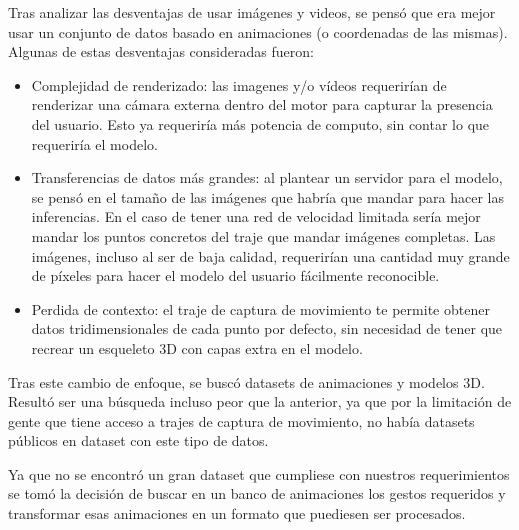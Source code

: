 Tras analizar las desventajas de usar imágenes y videos, se pensó que era mejor usar un conjunto de datos basado en animaciones (o coordenadas de las mismas). Algunas de estas desventajas consideradas fueron:
\begin{itemize}
    \item Complejidad de renderizado: las imagenes y/o vídeos requerirían de renderizar una cámara externa dentro del motor para capturar la presencia del usuario. Esto ya requeriría más potencia de computo, sin contar lo que requeriría el modelo.
    \item Transferencias de datos más grandes: al plantear un servidor para el modelo, se pensó en el tamaño de las imágenes que habría que mandar para hacer las inferencias. En el caso de tener una red de velocidad limitada sería mejor mandar los puntos concretos del traje que mandar imágenes completas. Las imágenes, incluso al ser de baja calidad, requerirían una cantidad muy grande de píxeles para hacer el modelo del usuario fácilmente reconocible.
    \item Perdida de contexto: el traje de captura de movimiento te permite obtener datos tridimensionales de cada punto por defecto, sin necesidad de tener que recrear un esqueleto 3D con capas extra en el modelo.
\end{itemize}

Tras este cambio de enfoque, se buscó datasets de animaciones y modelos 3D. Resultó ser una búsqueda incluso peor que la anterior, ya que por la limitación de gente que tiene acceso a trajes de captura de movimiento, no había datasets públicos en dataset con este tipo de datos.

Ya que no se encontró un gran dataset que cumpliese con nuestros requerimientos se tomó la decisión de buscar en un banco de animaciones los gestos requeridos y transformar esas animaciones en un formato que puediesen ser procesados.